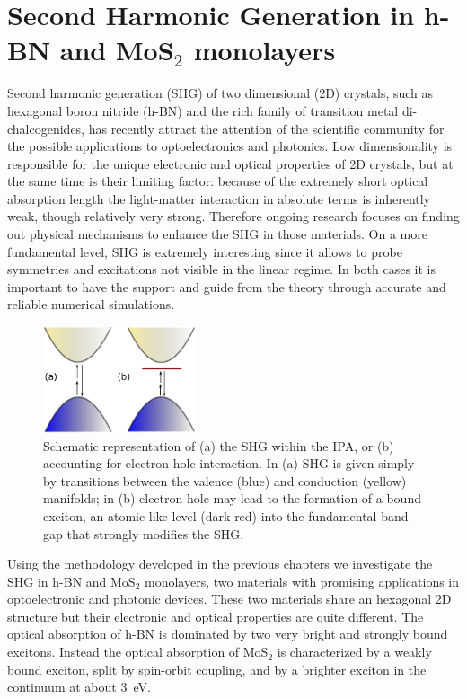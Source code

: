 \section{Second Harmonic Generation in h-BN and MoS$_2$ monolayers}
Second harmonic generation (SHG)
of two dimensional (2D) crystals, such as hexagonal boron nitride (h-BN) and the rich family of transition metal di-chalcogenides, has recently attract the attention of the scientific community for the possible applications to optoelectronics and photonics.\cite{doi:10.1021/nn403159y,PhysRevB.87.201401}
Low dimensionality is responsible for the unique electronic and optical properties of 2D crystals, but at the same time is their limiting factor: because of the extremely short optical absorption length the light-matter interaction in absolute terms is inherently weak, though relatively very strong.\cite{doi:10.1021/nn403159y} Therefore ongoing research focuses on finding out physical mechanisms to enhance the SHG in those materials. 
On a more fundamental level, SHG is extremely interesting since it allows to probe symmetries and excitations not visible in the linear regime.\cite{doi:10.1021/nl401561r,kumar2013second}   In both cases it is %
important to have the support and guide from the theory through accurate and reliable numerical simulations.
\begin{figure}
\begin{center}
\includegraphics[width=0.4\textwidth]{Figures/exciton}
\caption{\footnotesize{Schematic representation of  (a) the SHG within the IPA, or (b) accounting for electron-hole interaction. In (a) SHG is given simply by transitions between the valence (blue) and conduction (yellow) manifolds; in (b) electron-hole may lead to the formation of a bound exciton, an atomic-like level (dark red) into the fundamental band gap that strongly modifies the SHG.}}  
\end{center}
\end{figure} 
Using the methodology developed in the previous chapters we investigate the SHG in h-BN and MoS$_2$ monolayers, two materials with promising applications in optoelectronic and photonic devices. These two materials share an hexagonal 2D structure but their electronic and optical properties are quite different. The optical absorption of h-BN is dominated by two very bright and strongly bound excitons.\cite{PhysRevLett.96.126104,PhysRevLett.100.189701} Instead the optical absorption of MoS$_2$ is characterized by a weakly bound exciton, split by spin-orbit coupling,\cite{PhysRevLett.105.136805} and by a brighter exciton in the continuum at about 3~eV.\cite{molina2013effect} 
